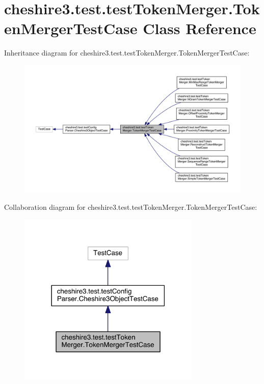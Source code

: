\hypertarget{classcheshire3_1_1test_1_1test_token_merger_1_1_token_merger_test_case}{\section{cheshire3.\-test.\-test\-Token\-Merger.\-Token\-Merger\-Test\-Case Class Reference}
\label{classcheshire3_1_1test_1_1test_token_merger_1_1_token_merger_test_case}
}


Inheritance diagram for cheshire3.\-test.\-test\-Token\-Merger.\-Token\-Merger\-Test\-Case\-:
\nopagebreak
\begin{figure}[H]
\begin{center}
\leavevmode
\includegraphics[width=350pt]{classcheshire3_1_1test_1_1test_token_merger_1_1_token_merger_test_case__inherit__graph}
\end{center}
\end{figure}


Collaboration diagram for cheshire3.\-test.\-test\-Token\-Merger.\-Token\-Merger\-Test\-Case\-:
\nopagebreak
\begin{figure}[H]
\begin{center}
\leavevmode
\includegraphics[width=246pt]{classcheshire3_1_1test_1_1test_token_merger_1_1_token_merger_test_case__coll__graph}
\end{center}
\end{figure}
